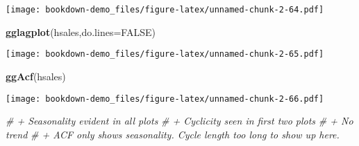 \documentclass[]{book}
\newenvironment{Shaded}{\begin{snugshade}}{\end{snugshade}}
\newcommand{\CommentTok}[1]{\textcolor[rgb]{0.56,0.35,0.01}{\textit{#1}}}
\newcommand{\DataTypeTok}[1]{\textcolor[rgb]{0.13,0.29,0.53}{#1}}
\newcommand{\KeywordTok}[1]{\textcolor[rgb]{0.13,0.29,0.53}{\textbf{#1}}}
\newcommand{\NormalTok}[1]{#1}
\newcommand{\OtherTok}[1]{\textcolor[rgb]{0.56,0.35,0.01}{#1}}
\begin{document}
\texttt{[image: bookdown-demo\_files/figure-latex/unnamed-chunk-2-64.pdf]}

\begin{Shaded}
\begin{Highlighting}[]
  \KeywordTok{gglagplot}\NormalTok{(hsales,}\DataTypeTok{do.lines=}\OtherTok{FALSE}\NormalTok{)}
\end{Highlighting}
\end{Shaded}

\texttt{[image: bookdown-demo\_files/figure-latex/unnamed-chunk-2-65.pdf]}

\begin{Shaded}
\begin{Highlighting}[]
  \KeywordTok{ggAcf}\NormalTok{(hsales)}
\end{Highlighting}
\end{Shaded}

\texttt{[image: bookdown-demo\_files/figure-latex/unnamed-chunk-2-66.pdf]}

\begin{Shaded}
\begin{Highlighting}[]
  \CommentTok{# + Seasonality evident in all plots}
  \CommentTok{# + Cyclicity seen in first two plots}
  \CommentTok{# + No trend}
  \CommentTok{# + ACF only shows seasonality. Cycle length too long to show up here.}
\end{Highlighting}
\end{Shaded}


\end{document}
